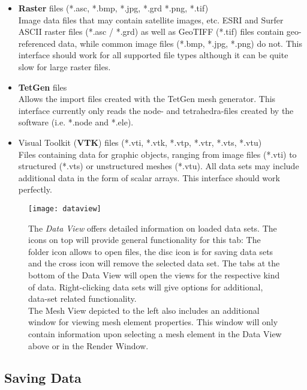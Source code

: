 \begin{itemize}
\item \textbf{Raster} files (*.asc, *.bmp, *.jpg, *.grd *.png, *.tif)\\
Image data files that may contain satellite images, etc. ESRI and Surfer ASCII raster files (*.asc / *.grd) as well as GeoTIFF (*.tif) files contain geo-referenced data, while common image files (*.bmp, *.jpg, *.png) do not. This interface should work for all supported file types although it can be quite slow for large raster files.
\item \textbf{TetGen} files\\
Allows the import files created with the TetGen mesh generator. This interface currently only reads the node- and tetrahedra-files created by the software (i.e. *.node and *.ele).
\item Visual Toolkit (\textbf{VTK}) files (*.vti, *.vtk, *.vtp, *.vtr, *.vts, *.vtu)\\
Files containing data for graphic objects, ranging from image files (*.vti) to structured (*.vts) or unstructured meshes (*.vtu). All data sets may include additional data in the form of scalar arrays. This interface should work perfectly.
\end{itemize}

\begin{figure}[tb]
\parbox[b]{.45\linewidth}{
    \texttt{[image: dataview]}
}
\parbox[b]{.55\linewidth}{
    \caption{The \emph{Data View} offers detailed information on loaded data sets. The icons on top will provide general functionality for this tab: The folder icon allows to open files, the disc icon is for saving data sets and the cross icon will remove the selected data set. The tabs at the bottom of the Data View will open the views for the respective kind of data. Right-clicking data sets will give options for additional, data-set related functionality.\\
    The Mesh View depicted to the left also includes an additional window for viewing mesh element properties. This window will only contain information upon selecting a mesh element in the Data View above or in the Render Window.}
}
\label{fig:interfaces}
\end{figure}

\subsection{Saving Data}

